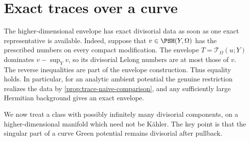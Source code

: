 \section{Exact traces over a curve}
\label{sec:curve-fibration-traces}

The higher-dimensional envelope has exact divisorial data as soon as one exact representative is available. Indeed, suppose that $v\in\PSH(Y,\Omega)$ has the prescribed numbers on every compact modification. The envelope $T=\mathcal T_\Omega(u;Y)$ dominates $v-\sup_Yv$, so its divisorial Lelong numbers are at most those of $v$. The reverse inequalities are part of the envelope construction. Thus equality holds. In particular, for an analytic ambient potential the genuine restriction realizes the data by \cref{prop:trace-naive-comparison}, and any sufficiently large Hermitian background gives an exact envelope.

We now treat a class with possibly infinitely many divisorial components, on a higher-dimensional manifold which need not be K\"ahler. The key point is that the singular part of a curve Green potential remains divisorial after pullback.

